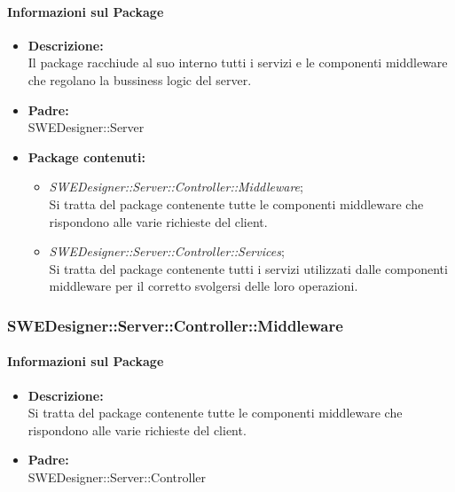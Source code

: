 		\paragraph{Informazioni sul Package}
		\begin{itemize}
			\item \textbf{Descrizione: }\\
			Il package racchiude al suo interno tutti i servizi e le componenti middleware che regolano la bussiness logic del server.
			\item \textbf{Padre: }\\ SWEDesigner::Server
			\item \textbf{Package contenuti: }
			\begin{itemize}
				\item \emph{SWEDesigner::Server::Controller::Middleware};\\
				Si tratta del package contenente tutte le componenti middleware che rispondono alle varie richieste del client.
				\item \emph{SWEDesigner::Server::Controller::Services};\\
				Si tratta del package contenente tutti i servizi utilizzati dalle componenti middleware per il corretto svolgersi delle loro operazioni.
			\end{itemize}
		\end{itemize}

		\subsubsection{SWEDesigner::Server::Controller::Middleware}
		\paragraph{Informazioni sul Package}
		\begin{itemize}
			\item \textbf{Descrizione: }\\
			Si tratta del package contenente tutte le componenti middleware che rispondono alle varie richieste del client.
			\item \textbf{Padre: }\\ SWEDesigner::Server::Controller
		\end{itemize}
